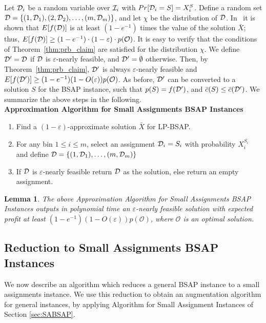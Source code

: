 \documentclass[11pt]{article}
\newtheorem{lemma}[theorem]{Lemma}
\newcommand{\eps}{\varepsilon}
\newcommand{\bX}{\bar{X}}
\newcommand{\bS}{S}
\newcommand{\cD}{{\cal D}}
\newcommand{\cI}{{\cal I}}
\newcommand{\bc}{\bar{c}}
\newcommand{\mO}{\mathcal{O}}
\begin{document}
{Let $\cD_i$ be a random variable over $\cI_i$ with $Pr[\cD_i = S] = X_i^S$. Define a random set $\cD =\{(1,\cD_1),(2,\cD_2),\ldots,(m,\cD_m)\}$,
and let $\chi$ be the distribution of $\cD$. In~\cite{fgms06} it is shown that $E[f(\cD)]$ is at least $(1-e^{-1})$ times the value of the
solution $\bX$; thus, $E[f(\cD)] \geq (1-e^{-1})\cdot (1-\eps) \cdot p(\mO)$.
It is easy to verify that the conditions of  Theorem~\ref{thm:prb_claim} are satisfied for the distribution $\chi$.
We define $\cD'=\cD$ if $\cD$ is $\eps$-nearly feasible, and $\cD'=\emptyset$ otherwise. Then, by Theorem~\ref{thm:prb_claim}, $\cD'$ is always
$\eps$-nearly feasible and $E[f(\cD')] \geq (1-e^{-1})(1-O(\eps))p(\mO)$. As before, $\cD'$ can be converted to a solution $\bS$ for the BSAP
instance, such that $p(\bS)= f(\cD')$, and $\bc(\bS) \leq \bc(\cD')$. We summarize the above steps in the following.
\\
\noindent
{\bf Approximation Algorithm for Small Assignments BSAP Instances}
\begin{enumerate}
\item Find a $(1-\eps)$-approximate solution $\bX$ for LP-BSAP.
\item For any bin $1 \leq i \leq m$,  select an assignment $\cD_i =S_i$ with probability $X_i^{S_i}$
and define $\cD = \{(1,\cD_1),\ldots,(m,\cD_m)\}$
\item If $\cD$ is $\eps$-nearly feasible return $\cD$ as the solution,
else return an empty assignment.
\end{enumerate}
\begin{lemma}
\label{thm:SABSAP} The above Approximation Algorithm for Small Assignments
 BSAP Instances outputs in polynomial time an $\eps$-nearly feasible
solution with  expected profit at least $(1-e^{-1})(1-O(\eps))p(\mO)$, where $\mO$ is an optimal solution.
\end{lemma}

\subsection{Reduction to Small Assignments BSAP Instances}

We now describe an algorithm which reduces a general BSAP instance
to a small assignments instance. We use this reduction to obtain an
augmentation algorithm for general instances, by applying Algorithm for Small Assignment Instances of
Section \ref{sec:SABSAP}.

}
\end{document}
